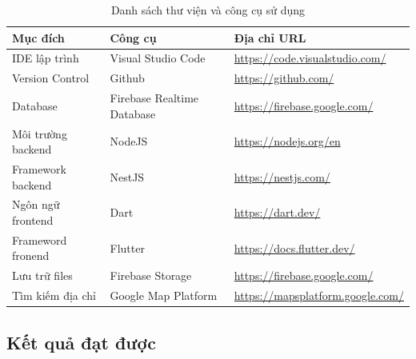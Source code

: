 \documentclass[../DoAn.tex]{subfiles}
\begin{document}
\begin{table}[H]
    \centering
    \begin{tabular}{|l|l|l|}
    \hline
    \textbf{Mục đích}  & \textbf{Công cụ}           & \textbf{Địa chỉ URL}                   \\ \hline
    IDE lập trình      & Visual Studio Code         & \url{https://code.visualstudio.com/}   \\ \hline
    Version Control    & Github                     & \url{https://github.com/}              \\ \hline
    Database           & Firebase Realtime Database & \url{https://firebase.google.com/}     \\ \hline
    Môi trường backend & NodeJS                     & \url{https://nodejs.org/en}            \\ \hline
    Framework backend  & NestJS                     & \url{https://nestjs.com/}              \\ \hline
    Ngôn ngữ frontend  & Dart                       & \url{https://dart.dev/}                \\ \hline
    Frameword fronend  & Flutter                    & \url{https://docs.flutter.dev/}        \\ \hline
    Lưu trữ files      & Firebase Storage           & \url{https://firebase.google.com/}     \\ \hline
    Tìm kiếm địa chỉ   & Google Map Platform        & \url{https://mapsplatform.google.com/} \\ \hline
    \end{tabular}
    \caption{Danh sách thư viện và công cụ sử dụng}
    \label{table:my_label}
\end{table}

\subsection{Kết quả đạt được}
\end{document}
